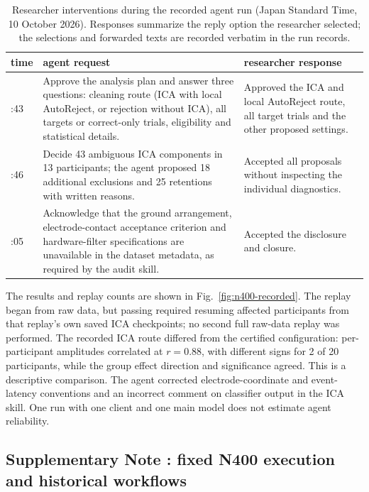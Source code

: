 \begin{table}[!htbp]
\centering\footnotesize
\caption{Researcher interventions during the recorded agent run (Japan Standard Time, 10 October 2026). Responses summarize the reply option the researcher selected; the selections and forwarded texts are recorded verbatim in the run records.}
\label{tab:interventions}
\begin{tabular}{>{\raggedright\arraybackslash}p{1.3cm}>{\raggedright\arraybackslash}p{6.6cm}>{\raggedright\arraybackslash}p{6.3cm}}
\toprule
time & agent request & researcher response \\
\midrule
15:43 & Approve the analysis plan and answer three questions: cleaning route (ICA with local AutoReject, or rejection without ICA), all targets or correct-only trials, eligibility and statistical details. & Approved the ICA and local AutoReject route, all target trials and the other proposed settings. \\
16:46 & Decide 43 ambiguous ICA components in 13 participants; the agent proposed 18 additional exclusions and 25 retentions with written reasons. & Accepted all proposals without inspecting the individual diagnostics. \\
18:05 & Acknowledge that the ground arrangement, electrode-contact acceptance criterion and hardware-filter specifications are unavailable in the dataset metadata, as required by the audit skill. & Accepted the disclosure and closure. \\
\bottomrule
\end{tabular}
\end{table}
The results and replay counts are shown in Fig.~\ref*{fig:n400-recorded}. The replay began from raw data, but passing required resuming affected participants from that replay's own saved ICA checkpoints; no second full raw-data replay was performed. The recorded ICA route differed from the certified configuration: per-participant amplitudes correlated at $r=0.88$, with different signs for 2 of 20 participants, while the group effect direction and significance agreed. This is a descriptive comparison. The agent corrected electrode-coordinate and event-latency conventions and an incorrect comment on classifier output in the ICA skill. One run with one client and one main model does not estimate agent reliability.

\FloatBarrier
{}
\subsection*{Supplementary Note \thesuppnote: fixed N400 execution and historical workflows}
\label{si:workflows}

